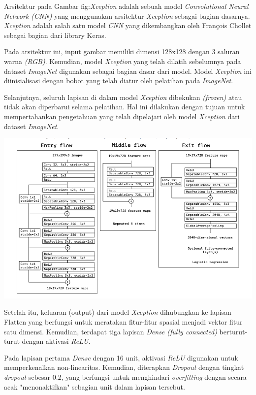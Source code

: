 Arsitektur pada Gambar {fig:\textit{Xception}} adalah sebuah model \textit{Convolutional Neural Network (\textit{CNN})} yang menggunakan arsitektur \textit{Xception} sebagai bagian dasarnya. \textit{Xception} adalah salah satu model \textit{CNN} yang dikembangkan oleh François Chollet sebagai bagian dari library Keras.

Pada arsitektur ini, input gambar memiliki dimensi 128x128 dengan 3 saluran warna \textit{(RGB)}. Kemudian, model \textit{Xception} yang telah dilatih sebelumnya pada dataset \textit{ImageNet} digunakan sebagai bagian dasar dari model. Model \textit{Xception} ini diinisialisasi dengan bobot yang telah diatur oleh pelatihan pada \textit{ImageNet}.

Selanjutnya, seluruh lapisan di dalam model \textit{Xception} dibekukan \textit{(frozen)} atau tidak akan diperbarui selama pelatihan. Hal ini dilakukan dengan tujuan untuk mempertahankan pengetahuan yang telah dipelajari oleh model \textit{Xception} dari dataset \textit{ImageNet}.

\begin{center}
	\includegraphics[width=0.7\linewidth]{gambar/bener/ArsitekturCNNXception.png}
	\label{fig:Xception}
\end{center}


Setelah itu, keluaran (output) dari model \textit{Xception} dihubungkan ke lapisan Flatten yang berfungsi untuk meratakan fitur-fitur spasial menjadi vektor fitur satu dimensi. Kemudian, terdapat tiga lapisan \textit{Dense (fully connected)} berturut-turut dengan aktivasi \textit{ReLU}.

Pada lapisan pertama \textit{Dense} dengan 16 unit, aktivasi \textit{ReLU} digunakan untuk memperkenalkan non-linearitas. Kemudian, diterapkan \textit{Dropout} dengan tingkat \textit{dropout} sebesar 0.2, yang berfungsi untuk menghindari \textit{overfitting} dengan secara acak "menonaktifkan" sebagian unit dalam lapisan tersebut.

